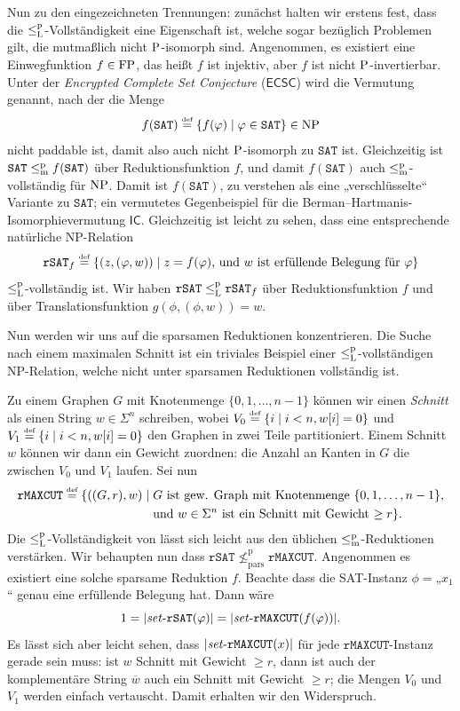 Nun zu den eingezeichneten Trennungen: zunächst halten wir erstens fest, dass die $\leqlp$-Vollständigkeit eine Eigenschaft ist, welche sogar bezüglich Problemen gilt, die mutmaßlich nicht $\P$-isomorph sind.
Angenommen, es existiert eine Einwegfunktion $f\in\FP$, das heißt $f$ ist injektiv, aber $f$ ist nicht $\P$-invertierbar.
Unter der \emph{Encrypted Complete Set Conjecture} ($\mathsf{ECSC}$) wird die Vermutung genannt, nach der die Menge
\[ f(\mathtt{SAT}) \defeq \{ f(\phi) \mid \phi\in\mathtt{SAT} \}\in\NP \]
nicht paddable ist, damit also auch nicht $\P$-isomorph zu $\mathtt{SAT}$ ist.
Gleichzeitig ist $\mathtt{SAT}\leqmp f(\mathtt{SAT})$ über Reduktionsfunktion $f$, und damit $f(\mathtt{SAT})$ auch $\leqmp$-vollständig für $\NP$.
Damit ist $f(\mathtt{SAT})$, zu verstehen als eine „verschlüsselte“ Variante zu $\mathtt{SAT}$; ein vermutetes Gegenbeispiel für die Berman–Hartmanis-Isomorphievermutung $\mathsf{IC}$.
Gleichzeitig ist leicht zu sehen, dass eine entsprechende natürliche NP-Relation
\[ \mathtt{rSAT}_f \defeq \{ (z, (\phi, w)) \mid \text{$z=f(\phi)$, und $w$ ist erfüllende Belegung für $\phi$} \} \]
$\leqlp$-vollständig ist. Wir haben $\mathtt{rSAT}\leqlp\mathtt{rSAT}_f$ über Reduktionsfunktion $f$ und über Translationsfunktion $g(\phi, (\phi, w))= w$.




Nun werden wir uns auf die sparsamen Reduktionen konzentrieren. Die Suche nach einem maximalen Schnitt ist ein triviales Beispiel einer $\leqlp$-vollständigen NP-Relation, welche nicht unter sparsamen Reduktionen vollständig ist.

Zu einem Graphen $G$ mit Knotenmenge $\{0,1,\dots, n-1\}$ können wir einen \emph{Schnitt} als einen String $w\in\Sigma^n$ schreiben, wobei $V_0 \defeq \{ i \mid i<n, w[i]=0\}$ und $V_1 \defeq \{ i \mid i<n, w[i]=0\}$ den Graphen in zwei Teile partitioniert. Einem Schnitt $w$ können wir dann ein Gewicht zuordnen: die Anzahl an Kanten in $G$ die zwischen $V_0$ und $V_1$ laufen.
Sei nun
\[ \begin{split} \mathtt{rMAXCUT} \defeq \{ ((G, r), w) \mid {}&\text{$G$ ist gew. Graph mit Knotenmenge $\{0,1,\dots,n-1\}$,} \\ &\text{und $w\in\Sigma^n$ ist ein Schnitt mit Gewicht $\geq r$} \}.\end{split} \]
 Die $\leqlp$-Vollständigkeit von lässt sich leicht aus den üblichen $\leqmp$-Reduktionen verstärken.
Wir behaupten nun dass $\mathtt{rSAT} \not\leq_\mathrm{pars}^\mathrm p \mathtt{rMAXCUT}$. Angenommen es existiert eine solche sparsame Reduktion $f$. Beachte dass die SAT-Instanz $\phi={}$„$x_1$“ genau eine erfüllende Belegung hat. Dann wäre
\[ 1=|\fset{}\mathtt{rSAT}(\phi)|=|\fset{}\mathtt{rMAXCUT}(f(\phi))|. \]
Es lässt sich aber leicht sehen, dass $|\fset{}\mathtt{rMAXCUT}(x)|$ für jede $\mathtt{rMAXCUT}$-Instanz gerade sein muss: ist $w$ Schnitt mit Gewicht $\geq r$, dann ist auch der komplementäre String $\overline{w}$ auch ein Schnitt mit Gewicht $\geq r$; die Mengen $V_0$ und $V_1$ werden einfach vertauscht.
Damit erhalten wir den Widerspruch.

